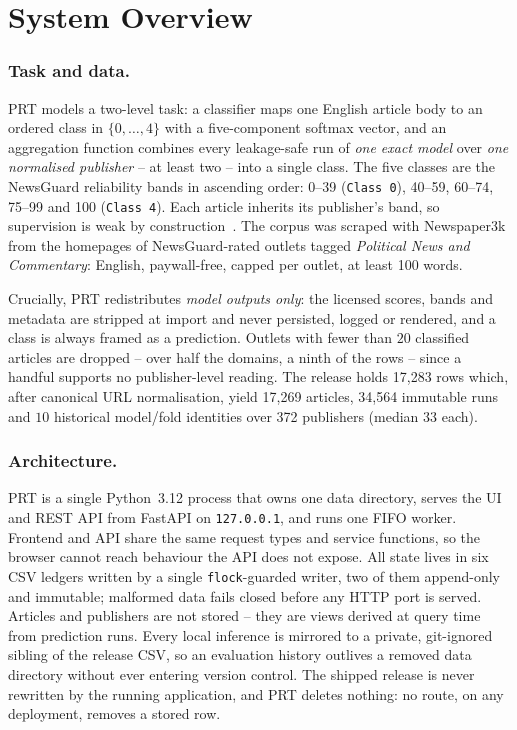 \documentclass[runningheads]{llncs}
\begin{document}
\section{System Overview}
\label{sec:system}

\subsubsection{Task and data.}
PRT models a two-level task: a classifier maps one English article body to an
ordered class in $\{0,\dots,4\}$ with a five-component softmax vector, and an
aggregation function combines every leakage-safe run of \emph{one exact model}
over \emph{one normalised publisher} -- at least two -- into a single class.
The five classes are the NewsGuard reliability bands in
ascending order: 0--39 (\texttt{Class~0}), 40--59, 60--74, 75--99 and 100
(\texttt{Class~4}). Each article inherits its publisher's band, so
supervision is weak by construction~\cite{bianchi2026articles}. The corpus was
scraped with Newspaper3k from the homepages of NewsGuard-rated outlets tagged
\emph{Political News and Commentary}: English, paywall-free, capped per outlet,
at least 100 words.

Crucially, PRT redistributes \emph{model outputs only}: the licensed scores,
bands and metadata are stripped at import and never persisted, logged or
rendered, and a class is always framed as a prediction. Outlets with fewer than
$20$ classified articles are dropped -- over half the domains, a ninth of the
rows -- since a handful supports no publisher-level reading. The release holds
17,283 rows which, after canonical URL normalisation, yield 17,269 articles,
34,564 immutable runs and $10$ historical model/fold identities over 372
publishers (median $33$ each).

\subsubsection{Architecture.}
PRT is a single Python~3.12 process that owns one data directory, serves the UI
and REST API from FastAPI on \texttt{127.0.0.1}, and runs one FIFO worker.
Frontend and API share the same request types and service functions, so the
browser cannot reach behaviour the API does not expose. All state lives in
six CSV ledgers written by a single \texttt{flock}-guarded writer, two of
them append-only and immutable; malformed data fails closed before any HTTP
port is served. Articles and publishers are not stored -- they are views
derived at query time from prediction runs. Every local inference is mirrored
to a private, git-ignored sibling of the release CSV, so an evaluation history
outlives a removed data directory without ever entering version control. The
shipped release is never rewritten by the running application, and PRT deletes
nothing: no route, on any deployment, removes a stored row.
\end{document}

